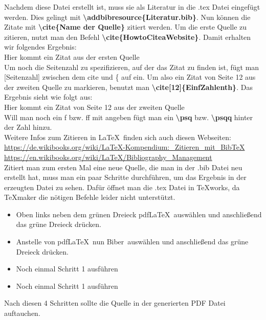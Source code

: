 \documentclass[a4paper, 12pt]{scrreprt}
\begin{document}
Nachdem diese Datei erstellt ist, muss sie als Literatur in die .tex Datei eingefügt werden. Dies gelingt mit \textbf{\textbackslash addbibresource\{Literatur.bib\}}. Nun können die Zitate mit \textbf{\textbackslash cite\{Name der Quelle\}} zitiert werden.
Um die erste Quelle zu zitieren, nutzt man den Befehl \textbf{\textbackslash cite\{HowtoCiteaWebsite\}}. Damit erhalten wir folgendes Ergebnis:\\
\hspace*{0.5cm} Hier kommt ein Zitat aus der ersten Quelle \cite{HowtoCiteaWebsite}\\

\noindent Um noch die Seitenzahl zu spezifizieren, auf der das Zitat zu finden ist, fügt man [Seitenzahl] zwischen dem cite und \{ auf ein. Um also ein Zitat von Seite 12 aus der zweiten Quelle zu markieren, benutzt man \textbf{\textbackslash cite[12]\{EinfZahlenth\}}. Das Ergebnis sieht wie folgt aus:\\
\hspace*{0.5cm} Hier kommt ein Zitat von Seite 12 aus der zweiten Quelle \cite[12]{EinfZahlenth}\\
Will man noch ein f bzw. ff mit angeben fügt man ein \textbf{\textbackslash psq} bzw. \textbf{\textbackslash psqq} hinter der Zahl hinzu.\\
Weitere Infos zum Zitieren in \LaTeX\, finden sich auch diesen Webseiten:\\
\href{https://de.wikibooks.org/wiki/LaTeX-Kompendium:_Zitieren_mit_BibTeX}{https://de.wikibooks.org/wiki/LaTeX-Kompendium:\_Zitieren\_mit\_BibTeX}\\
\href{https://en.wikibooks.org/wiki/LaTeX/Bibliography_Management}{https://en.wikibooks.org/wiki/LaTeX/Bibliography\_Management}\\

Zitiert man zum ersten Mal eine neue Quelle, die man in der .bib Datei neu erstellt hat, muss man ein paar Schritte durchführen, um das Ergebnis in der erzeugten Datei zu sehen. Dafür öffnet man die .tex Datei in TeXworks, da TeXmaker die nötigen Befehle leider nicht unterstützt.
\begin{addmargin}{1.5cm}
\begin{itemize}
\item[Schritt 1] Oben links neben dem grünen Dreieck \glqq pdfLaTeX\grqq\, auswählen und anschließend das grüne Dreieck drücken.
\item[Schritt 2] Anstelle von \glqq pdfLaTeX\grqq\, nun \glqq Biber\grqq\, auswählen und anschließend das grüne Dreieck drücken.
\item[Schritt 3] Noch einmal Schritt 1 ausführen
\item[Schritt 4] Noch einmal Schritt 1 ausführen
\end{itemize}
\end{addmargin}
Nach diesen 4 Schritten sollte die Quelle in der generierten PDF Datei auftauchen.\\
\end{document}
